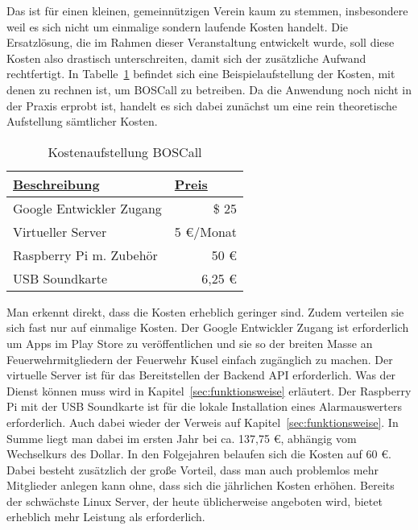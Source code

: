 Das ist für einen kleinen, gemeinnützigen Verein kaum zu stemmen, insbesondere weil es sich nicht um einmalige sondern laufende Kosten handelt. Die Ersatzlösung, die im Rahmen dieser Veranstaltung entwickelt wurde, soll diese Kosten also drastisch unterschreiten, damit sich der zusätzliche Aufwand rechtfertigt. In Tabelle~\ref{tbl:BOSCallPricing} befindet sich eine Beispielaufstellung der Kosten, mit denen zu rechnen ist, um BOSCall zu betreiben. Da die Anwendung noch nicht in der Praxis erprobt ist, handelt es sich dabei zunächst um eine rein theoretische Aufstellung sämtlicher Kosten.

\begin{table}[]
	\centering
	\caption{Kostenaufstellung BOSCall}
	\label{tbl:BOSCallPricing}
	\begin{tabular}{|l|r|}
		\hline
		{\ul \textbf{Beschreibung}} & \multicolumn{1}{l|}{{\ul \textbf{Preis}}} \\ \hline
		Google Entwickler Zugang    & \$ 25                                     \\ \hline
		Virtueller Server           & 5 €/Monat                                 \\ \hline
		Raspberry Pi m. Zubehör     & 50 €                                      \\ \hline
		USB Soundkarte              & 6,25 €                                    \\ \hline
	\end{tabular}
\end{table}

Man erkennt direkt, dass die Kosten erheblich geringer sind. Zudem verteilen sie sich fast nur auf einmalige Kosten. Der Google Entwickler Zugang ist erforderlich um Apps im Play Store zu veröffentlichen und sie so der breiten Masse an Feuerwehrmitgliedern der Feuerwehr Kusel einfach zugänglich zu machen. Der virtuelle Server ist für das Bereitstellen der Backend API erforderlich. Was der Dienst können muss wird in Kapitel~\ref{sec:funktionsweise} erläutert.  Der Raspberry Pi mit der USB Soundkarte ist für die lokale Installation eines Alarmauswerters erforderlich. Auch dabei wieder der Verweis auf Kapitel~\ref{sec:funktionsweise}. In Summe liegt man dabei im ersten Jahr bei ca. 137,75 €, abhängig vom Wechselkurs des Dollar. In den Folgejahren belaufen sich die Kosten auf 60 €. Dabei besteht zusätzlich der große Vorteil, dass man auch problemlos mehr Mitglieder anlegen kann ohne, dass sich die jährlichen Kosten erhöhen. Bereits der schwächste Linux Server, der heute üblicherweise angeboten wird, bietet erheblich mehr Leistung als erforderlich.